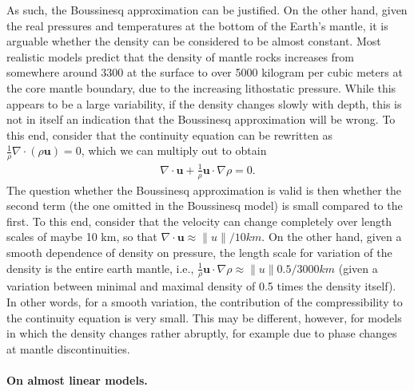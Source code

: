 \documentclass{article}
\begin{document}
As such, the Boussinesq approximation can be justified. On the other hand,
given the real pressures and temperatures at the bottom of the Earth's mantle,
it is arguable whether the density can be considered to be almost
constant. Most realistic models predict that the density of mantle rocks
increases from somewhere around 3300 at the surface to over 5000 kilogram per
cubic meters at the core mantle boundary, due to the increasing lithostatic
pressure. While this appears to be a large variability, if the density changes
slowly with depth, this is not in itself an indication that the Boussinesq
approximation will be wrong. To this end, consider that the continuity
equation can be rewritten as $\frac 1\rho \nabla \cdot (\rho \mathbf u)=0$,
which we can multiply out to obtain
\begin{gather*}
  \nabla \cdot \mathbf u
  +
  \frac 1\rho \mathbf u \cdot \nabla \rho
  = 0.
\end{gather*}
The question whether the Boussinesq approximation is valid is then whether the
second term (the one omitted in the Boussinesq model) is small compared to the
first. To this end, consider that the velocity can change completely over length
scales of maybe 10 km, so that $\nabla \cdot\mathbf u \approx \|u\| /
10\si{km}$. On the other hand, given a smooth dependence of density on pressure,
the length scale for variation of the density is the entire earth mantle,
i.e., $\frac 1\rho \mathbf u \cdot \nabla\rho \approx \|u\| 0.5 / 3000 \si{km}$
(given a variation between minimal and maximal density of 0.5 times the
density itself). In other words, for a smooth variation, the contribution of
the compressibility to the continuity equation is very small. This may be
different, however, for models in which the density changes rather abruptly,
for example due to phase changes at mantle discontinuities.

\paragraph{On almost linear models.}
\end{document}
